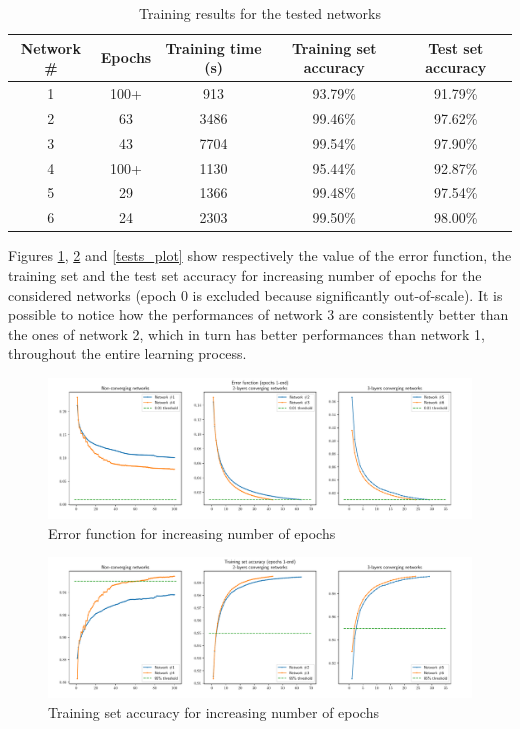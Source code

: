 \documentclass[letterpaper,headings=standardclasses]{scrartcl}
\begin{document}
\begin{table}[h]
    \centering
    \begin{tabular}{|c|c|c|c|c|}
    \hline
    Network \# & Epochs & Training time (s) & Training set accuracy & Test set accuracy \\ \hline
    1 & 100+ & 913 & 93.79\% & 91.79\% \\ \hline
    2 & 63 & 3486 & 99.46\% & 97.62\% \\ \hline
    3 & 43 & 7704 & 99.54\% & 97.90\% \\ \hline
    4 & 100+ & 1130 & 95.44\% & 92.87\% \\ \hline
    5 & 29 & 1366 & 99.48\% & 97.54\% \\ \hline
    6 & 24 & 2303 & 99.50\% & 98.00\% \\ \hline
    \end{tabular}
    \caption{Training results for the tested networks}
    \label{net_results}
\end{table}

Figures \ref{errors_plot}, \ref{trains_plot} and \ref{tests_plot} show respectively the value of the error function, the training set and the test set accuracy for increasing number of epochs for the considered networks (epoch 0 is excluded because significantly out-of-scale). It is possible to notice how the performances of network 3 are consistently better than the ones of network 2, which in turn has better performances than network 1, throughout the entire learning process.

\begin{figure}[H]
    \centering
    \includegraphics[width=\linewidth]{errors.pdf}
    \caption{Error function for increasing number of epochs}
    \label{errors_plot}
\end{figure}

\begin{figure}[H]
    \centering
    \includegraphics[width=\linewidth]{trains.pdf}
    \caption{Training set accuracy for increasing number of epochs}
    \label{trains_plot}
\end{figure}
\end{document}
